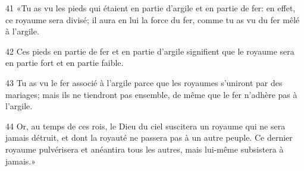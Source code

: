 
41 «Tu as vu les pieds qui étaient en partie d’argile et en partie de fer: en effet, ce royaume sera divisé; il aura en lui la force du fer, comme tu as vu du fer mêlé à l’argile.

42 Ces pieds en partie de fer et en partie d’argile signifient que le royaume sera en partie fort et en partie faible.

43 Tu as vu le fer associé à l’argile parce que les royaumes s’uniront par des mariages; mais ils ne tiendront pas ensemble, de même que le fer n’adhère pas à l’argile.

44 Or, au temps de ces rois, le Dieu du ciel suscitera un royaume qui ne sera jamais détruit, et dont la royauté ne passera pas à un autre peuple. Ce dernier royaume pulvérisera et anéantira tous les autres, mais lui-même subsistera à jamais.»